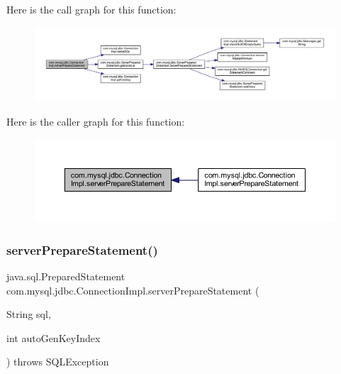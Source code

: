 Here is the call graph for this function\+:\nopagebreak
\begin{figure}[H]
\begin{center}
\leavevmode
\includegraphics[width=350pt]{classcom_1_1mysql_1_1jdbc_1_1_connection_impl_a32bbaa44990d6c0094b9697bf298bb60_cgraph}
\end{center}
\end{figure}
Here is the caller graph for this function\+:\nopagebreak
\begin{figure}[H]
\begin{center}
\leavevmode
\includegraphics[width=350pt]{classcom_1_1mysql_1_1jdbc_1_1_connection_impl_a32bbaa44990d6c0094b9697bf298bb60_icgraph}
\end{center}
\end{figure}
\mbox{\label{classcom_1_1mysql_1_1jdbc_1_1_connection_impl_a03fa01b17c7f7166c578fcd596fb9a8a}} 
\subsubsection{\texorpdfstring{server\+Prepare\+Statement()}{serverPrepareStatement()}\hspace{0.1cm}{\footnotesize\ttfamily [2/6]}}
{\footnotesize\ttfamily java.\+sql.\+Prepared\+Statement com.\+mysql.\+jdbc.\+Connection\+Impl.\+server\+Prepare\+Statement (\begin{DoxyParamCaption}\item[{String}]{sql,  }\item[{int}]{auto\+Gen\+Key\+Index }\end{DoxyParamCaption}) throws S\+Q\+L\+Exception}

